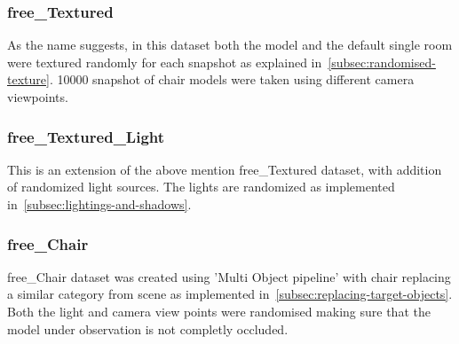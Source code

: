 \subsubsection{\Gls{free}\_Textured}

    As the name suggests, in this dataset both the model and the default single room were textured randomly for each snapshot as explained in~\ref{subsec:randomised-texture}.
    10000 snapshot of chair models were taken using different camera viewpoints.

\subsubsection{\Gls{free}\_Textured\_Light}

    This is an extension of the above mention \gls{free}\_Textured dataset, with addition of randomized light sources.
    The lights are randomized as implemented in~\ref{subsec:lightings-and-shadows}.

\subsubsection{\gls{free}\_Chair}

    \Gls{free}\_Chair dataset was created using 'Multi Object pipeline' with chair replacing a similar category from scene as implemented in~\ref{subsec:replacing-target-objects}.
    Both the light and camera view points were randomised making sure that the model under observation is not completly occluded.


